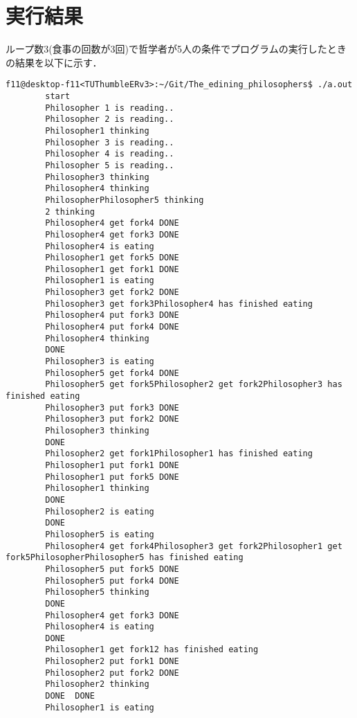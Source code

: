 \documentclass[a4paper,dvipdfmx]{jsarticle}
\begin{document}
\section{実行結果}
    ループ数3(食事の回数が3回)で哲学者が5人の条件でプログラムの実行したときの結果を以下に示す．
    \begin{lstlisting}[caption=実行結果,label=run_res]
        f11@desktop-f11<TUThumbleERv3>:~/Git/The_edining_philosophers$ ./a.out
        start
        Philosopher 1 is reading..
        Philosopher 2 is reading..
        Philosopher1 thinking
        Philosopher 3 is reading..
        Philosopher 4 is reading..
        Philosopher 5 is reading..
        Philosopher3 thinking
        Philosopher4 thinking
        PhilosopherPhilosopher5 thinking
        2 thinking
        Philosopher4 get fork4 DONE 
        Philosopher4 get fork3 DONE 
        Philosopher4 is eating
        Philosopher1 get fork5 DONE 
        Philosopher1 get fork1 DONE 
        Philosopher1 is eating
        Philosopher3 get fork2 DONE 
        Philosopher3 get fork3Philosopher4 has finished eating
        Philosopher4 put fork3 DONE 
        Philosopher4 put fork4 DONE 
        Philosopher4 thinking
        DONE 
        Philosopher3 is eating
        Philosopher5 get fork4 DONE 
        Philosopher5 get fork5Philosopher2 get fork2Philosopher3 has finished eating
        Philosopher3 put fork3 DONE 
        Philosopher3 put fork2 DONE 
        Philosopher3 thinking
        DONE 
        Philosopher2 get fork1Philosopher1 has finished eating
        Philosopher1 put fork1 DONE 
        Philosopher1 put fork5 DONE 
        Philosopher1 thinking
        DONE 
        Philosopher2 is eating
        DONE 
        Philosopher5 is eating
        Philosopher4 get fork4Philosopher3 get fork2Philosopher1 get fork5PhilosopherPhilosopher5 has finished eating
        Philosopher5 put fork5 DONE 
        Philosopher5 put fork4 DONE 
        Philosopher5 thinking
        DONE 
        Philosopher4 get fork3 DONE 
        Philosopher4 is eating
        DONE 
        Philosopher1 get fork12 has finished eating
        Philosopher2 put fork1 DONE 
        Philosopher2 put fork2 DONE 
        Philosopher2 thinking
        DONE  DONE 
        Philosopher1 is eating


\end{lstlisting}
\end{document}
